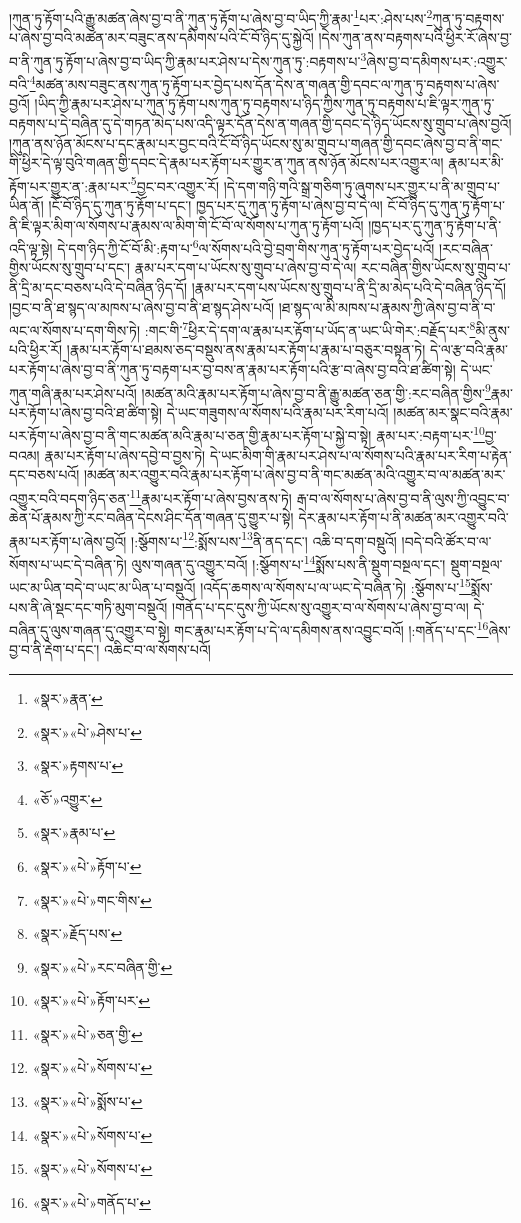 །ཀུན་ཏུ་རྟོག་པའི་རྒྱུ་མཚན་ཞེས་བྱ་བ་ནི་ཀུན་ཏུ་རྟོག་པ་ཞེས་བྱ་བ་ཡིད་ཀྱི་རྣམ་\footnote{«སྣར་»རྣན་}པར་:ཤེས་པས་\footnote{«སྣར་»«པེ་»ཤེས་པ་}ཀུན་ཏུ་བརྟགས་པ་ཞེས་བྱ་བའི་མཚན་མར་བཟུང་ནས་དམིགས་པའི་ངོ་བོ་ཉིད་དུ་སྐྱེའོ། །དེས་ཀུན་ནས་བརྟགས་པའི་ཕྱིར་རོ་ཞེས་བྱ་བ་ནི་ཀུན་ཏུ་རྟོག་པ་ཞེས་བྱ་བ་ཡིད་ཀྱི་རྣམ་པར་ཤེས་པ་དེས་ཀུན་ཏུ་:བརྟགས་པ་\footnote{«སྣར་»རྟགས་པ་}ཞེས་བྱ་བ་དམིགས་པར་:འགྱུར་བའི་\footnote{«ཅོ་»འགྱུར་}མཚན་མས་བཟུང་ནས་ཀུན་ཏུ་རྟོག་པར་བྱེད་པས་དོན་དེས་ན་གཞན་གྱི་དབང་ལ་ཀུན་ཏུ་བརྟགས་པ་ཞེས་བྱའོ། །ཡིད་ཀྱི་རྣམ་པར་ཤེས་པ་ཀུན་ཏུ་རྟོག་པས་ཀུན་ཏུ་བརྟགས་པ་ཉིད་ཀྱིས་ཀུན་ཏུ་བརྟགས་པ་ཇི་ལྟར་ཀུན་ཏུ་བརྟགས་པ་དེ་བཞིན་དུ་དེ་གཏན་མེད་པས་འདི་ལྟར་དོན་དེས་ན་གཞན་གྱི་དབང་དེ་ཉིད་ཡོངས་སུ་གྲུབ་པ་ཞེས་བྱའོ། །ཀུན་ནས་ཉོན་མོངས་པ་དང་རྣམ་པར་བྱང་བའི་ངོ་བོ་ཉིད་ཡོངས་སུ་མ་གྲུབ་པ་གཞན་གྱི་དབང་ཞེས་བྱ་བ་ནི་གང་གི་ཕྱིར་དེ་ལྟ་བུའི་གཞན་གྱི་དབང་དེ་རྣམ་པར་རྟོག་པར་གྱུར་ན་ཀུན་ནས་ཉོན་མོངས་པར་འགྱུར་ལ། རྣམ་པར་མི་རྟོག་པར་གྱུར་ན་:རྣམ་པར་\footnote{«སྣར་»རྣམ་པ་}བྱང་བར་འགྱུར་རོ། །དེ་དག་གཉི་གའི་སྒྲ་གཅིག་ཏུ་ཞུགས་པར་གྱུར་པ་ནི་མ་གྲུབ་པ་ཡིན་ནོ། །ངོ་བོ་ཉིད་དུ་ཀུན་ཏུ་རྟོག་པ་དང་། ཁྱད་པར་དུ་ཀུན་ཏུ་རྟོག་པ་ཞེས་བྱ་བ་དེ་ལ། ངོ་བོ་ཉིད་དུ་ཀུན་ཏུ་རྟོག་པ་ནི་ཇི་ལྟར་མིག་ལ་སོགས་པ་རྣམས་ལ་མིག་གི་ངོ་བོ་ལ་སོགས་པ་ཀུན་ཏུ་རྟོག་པའོ། །ཁྱད་པར་དུ་ཀུན་ཏུ་རྟོག་པ་ནི་འདི་ལྟ་སྟེ། དེ་དག་ཉིད་ཀྱི་ངོ་བོ་མི་:རྟག་པ་\footnote{«སྣར་»«པེ་»རྟོག་པ་}ལ་སོགས་པའི་བྱེ་བྲག་གིས་ཀུན་ཏུ་རྟོག་པར་བྱེད་པའོ། །རང་བཞིན་གྱིས་ཡོངས་སུ་གྲུབ་པ་དང་། རྣམ་པར་དག་པ་ཡོངས་སུ་གྲུབ་པ་ཞེས་བྱ་བ་དེ་ལ། རང་བཞིན་གྱིས་ཡོངས་སུ་གྲུབ་པ་ནི་དྲི་མ་དང་བཅས་པའི་དེ་བཞིན་ཉིད་དོ། །རྣམ་པར་དག་པས་ཡོངས་སུ་གྲུབ་པ་ནི་དྲི་མ་མེད་པའི་དེ་བཞིན་ཉིད་དོ། །བྱང་བ་ནི་ཐ་སྙད་ལ་མཁས་པ་ཞེས་བྱ་བ་ནི་ཐ་སྙད་ཤེས་པའོ། །ཐ་སྙད་ལ་མི་མཁས་པ་རྣམས་ཀྱི་ཞེས་བྱ་བ་ནི་བ་ལང་ལ་སོགས་པ་དག་གིས་ཏེ། :གང་གི་\footnote{«སྣར་»«པེ་»གང་གིས་}ཕྱིར་དེ་དག་ལ་རྣམ་པར་རྟོག་པ་ཡོད་ན་ཡང་ཡི་གེར་:བརྗོད་པར་\footnote{«སྣར་»རྗོད་པས་}མི་ནུས་པའི་ཕྱིར་རོ། །རྣམ་པར་རྟོག་པ་ཐམས་ཅད་བསྡུས་ནས་རྣམ་པར་རྟོག་པ་རྣམ་པ་བཅུར་བསྟན་ཏེ། དེ་ལ་རྩ་བའི་རྣམ་པར་རྟོག་པ་ཞེས་བྱ་བ་ནི་ཀུན་ཏུ་བརྟག་པར་བྱ་བས་ན་རྣམ་པར་རྟོག་པའི་རྩ་བ་ཞེས་བྱ་བའི་ཐ་ཚིག་སྟེ། དེ་ཡང་ཀུན་གཞི་རྣམ་པར་ཤེས་པའོ། །མཚན་མའི་རྣམ་པར་རྟོག་པ་ཞེས་བྱ་བ་ནི་རྒྱུ་མཚན་ཅན་གྱི་:རང་བཞིན་གྱིས་\footnote{«སྣར་»«པེ་»རང་བཞིན་གྱི་}རྣམ་པར་རྟོག་པ་ཞེས་བྱ་བའི་ཐ་ཚིག་སྟེ། དེ་ཡང་གཟུགས་ལ་སོགས་པའི་རྣམ་པར་རིག་པའོ། །མཚན་མར་སྣང་བའི་རྣམ་པར་རྟོག་པ་ཞེས་བྱ་བ་ནི་གང་མཚན་མའི་རྣམ་པ་ཅན་གྱི་རྣམ་པར་རྟོག་པ་སྐྱེ་བ་སྟེ། རྣམ་པར་:བརྟག་པར་\footnote{«སྣར་»«པེ་»རྟོག་པར་}བྱ་བའམ། རྣམ་པར་རྟོག་པ་ཞེས་དབྱེ་བ་བྱས་ཏེ། དེ་ཡང་མིག་གི་རྣམ་པར་ཤེས་པ་ལ་སོགས་པའི་རྣམ་པར་རིག་པ་རྟེན་དང་བཅས་པའོ། །མཚན་མར་འགྱུར་བའི་རྣམ་པར་རྟོག་པ་ཞེས་བྱ་བ་ནི་གང་མཚན་མའི་འགྱུར་བ་ལ་མཚན་མར་འགྱུར་བའི་བདག་ཉིད་ཅན་\footnote{«སྣར་»«པེ་»ཅན་གྱི་}རྣམ་པར་རྟོག་པ་ཞེས་བྱས་ནས་ཏེ། རྒ་བ་ལ་སོགས་པ་ཞེས་བྱ་བ་ནི་ལུས་ཀྱི་འབྱུང་བ་ཆེན་པོ་རྣམས་ཀྱི་རང་བཞིན་དེངས་ཤིང་དོན་གཞན་དུ་གྱུར་པ་སྟེ། དེར་རྣམ་པར་རྟོག་པ་ནི་མཚན་མར་འགྱུར་བའི་རྣམ་པར་རྟོག་པ་ཞེས་བྱའོ། །:སྩོགས་པ་\footnote{«སྣར་»«པེ་»སོགས་པ་}:སྨོས་པས་\footnote{«སྣར་»«པེ་»སྨོས་པ་}ནི་ནད་དང་། འཆི་བ་དག་བསྡུའོ། །བདེ་བའི་ཚོར་བ་ལ་སོགས་པ་ཡང་དེ་བཞིན་ཏེ། ལུས་གཞན་དུ་འགྱུར་བའོ། །:སྩོགས་པ་\footnote{«སྣར་»«པེ་»སོགས་པ་}སྨོས་པས་ནི་སྡུག་བསྔལ་དང་། སྡུག་བསྔལ་ཡང་མ་ཡིན་བདེ་བ་ཡང་མ་ཡིན་པ་བསྡུའོ། །འདོད་ཆགས་ལ་སོགས་པ་ལ་ཡང་དེ་བཞིན་ཏེ། :སྩོགས་པ་\footnote{«སྣར་»«པེ་»སོགས་པ་}སྨོས་པས་ནི་ཞེ་སྡང་དང་གཏི་མུག་བསྡུའོ། །གནོད་པ་དང་དུས་ཀྱི་ཡོངས་སུ་འགྱུར་བ་ལ་སོགས་པ་ཞེས་བྱ་བ་ལ། དེ་བཞིན་དུ་ལུས་གཞན་དུ་འགྱུར་བ་སྟེ། གང་རྣམ་པར་རྟོག་པ་དེ་ལ་དམིགས་ནས་འབྱུང་བའོ། །:གནོད་པ་དང་\footnote{«སྣར་»«པེ་»གནོད་པ་}ཞེས་བྱ་བ་ནི་རྡེག་པ་དང་། འཆིང་བ་ལ་སོགས་པའོ། 